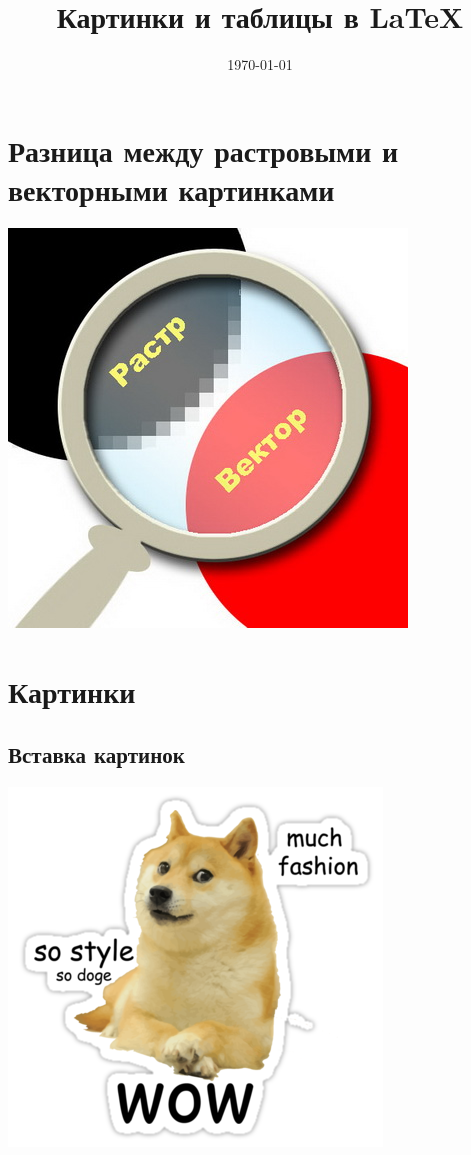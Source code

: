\documentclass[12pt, a4paper]{article}
\title{Картинки и таблицы в \LaTeX}
\date{\today}
\begin{document}

\maketitle

\section{Разница между растровыми и векторными картинками}


\includegraphics[scale=0.8]{rv.jpg}



\section{Картинки}
\subsection{Вставка картинок}

\includegraphics{doge.png}
\end{document}
